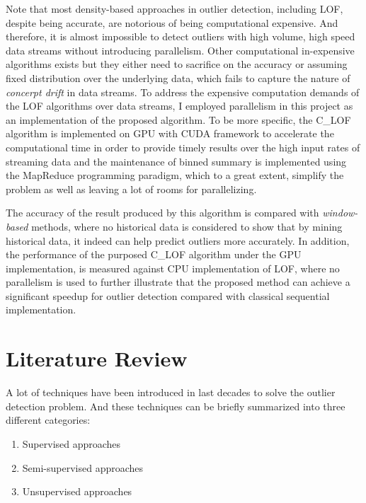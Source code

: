 \documentclass[11pt]{article}       %
\begin{document}
Note that most density-based approaches in outlier detection, including LOF, despite being accurate, are notorious of being computational expensive. And therefore, it is almost impossible to detect outliers with high volume, high speed data streams without introducing parallelism. Other computational in-expensive algorithms exists but they either need to sacrifice on the accuracy or assuming fixed distribution over the underlying data, which fails to capture the nature of \textit{concerpt drift} in data streams. To address the expensive computation demands of the LOF algorithms over data streams, I employed parallelism in this project as an implementation of the proposed algorithm. To be more specific, the C\_LOF algorithm is implemented on GPU with CUDA framework to accelerate the computational time in order to provide timely results over the high input rates of streaming data and the maintenance of binned summary is implemented using the MapReduce programming paradigm, which to a great extent, simplify the problem as well as leaving a lot of rooms for parallelizing. 


The accuracy of the result produced by this algorithm is compared with \textit{window-based} methods, where no historical data is considered to show that by mining historical data, it indeed can help predict outliers more accurately. In addition, the performance of the purposed C\_LOF algorithm under the GPU implementation, is measured against CPU implementation of LOF, where no parallelism is used to further illustrate that the proposed method can achieve a significant speedup for outlier detection compared with classical sequential implementation.

\section{Literature Review} \label{litrev}

A lot of techniques have been introduced in last decades to solve the outlier detection problem. And these techniques can be briefly summarized into three different categories: 

\begin{enumerate}
  \item Supervised approaches
  \item Semi-supervised approaches
  \item Unsupervised approaches
\end{enumerate}
\end{document}
